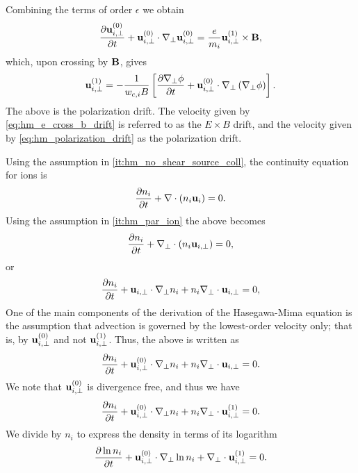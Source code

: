 \documentclass[11pt]{article}
\begin{document}
Combining the terms of order $\epsilon$ we obtain
\begin{equation}
    \frac{\partial \mathbf{u}_{i,\perp}^{(0)}}{\partial t} + \mathbf{u}_{i,\perp}^{(0)} \cdot \nabla_\perp \mathbf{u}_{i,\perp}^{(0)} = \frac{e}{m_i} \mathbf{u}_{i,\perp}^{(1)} \times \mathbf{B},
\end{equation}
which, upon crossing by $\mathbf{B}$, gives
\begin{equation}
\label{eq:hm_polarization_drift}
    \mathbf{u}_{i,\perp}^{(1)} = -\frac{1}{w_{c,i} B} \left [ \frac{\partial \nabla_\perp \phi}{\partial t} + \mathbf{u}_{i,\perp}^{(0)} \cdot \nabla_\perp \left ( \nabla_\perp \phi \right ) \right ].
\end{equation}
The above is the polarization drift. The velocity given by \cref{eq:hm_e_cross_b_drift} is referred to as the $E \times B$ drift, and the velocity given by \cref{eq:hm_polarization_drift} as the polarization drift.

Using the assumption in \cref{it:hm_no_shear_source_coll}, the continuity equation for ions is
\begin{equation}
    \frac{\partial n_i}{\partial t} + \nabla \cdot (n_i \mathbf{u}_i) = 0.
\end{equation}
Using the assumption in \cref{it:hm_par_ion} the above becomes
\begin{equation}
    \frac{\partial n_i}{\partial t} + \nabla_\perp \cdot (n_i \mathbf{u}_{i,\perp}) = 0,
\end{equation}
or
\begin{equation}
    \frac{\partial n_i}{\partial t} +  \mathbf{u}_{i,\perp} \cdot \nabla_\perp n_i + n_i \nabla_\perp \cdot \mathbf{u}_{i,\perp} = 0,
\end{equation}
One of the main components of the derivation of the Hasegawa-Mima equation is the assumption that advection is governed by the lowest-order velocity only; that is, by $\mathbf{u}^{(0)}_{i,\perp}$ and not $\mathbf{u}^{(1)}_{i,\perp}$. Thus, the above is written as
\begin{equation}
    \frac{\partial n_i}{\partial t} +  \mathbf{u}^{(0)}_{i,\perp} \cdot \nabla_\perp n_i + n_i \nabla_\perp \cdot \mathbf{u}_{i,\perp} = 0.
\end{equation}
We note that $\mathbf{u}^{(0)}_{i,\perp}$ is divergence free, and thus we have
\begin{equation}
    \frac{\partial n_i}{\partial t} +  \mathbf{u}^{(0)}_{i,\perp} \cdot \nabla_\perp n_i + n_i \nabla_\perp \cdot \mathbf{u}^{(1)}_{i,\perp} = 0.
\end{equation}
We divide by $n_i$ to express the density in terms of its logarithm 
\begin{equation}
    \label{eq:intermediate_hm_1}
    \frac{\partial \ln n_i}{\partial t} + \mathbf{u}^{(0)}_{i,\perp} \cdot \nabla_\perp \ln n_i + \nabla_\perp \cdot \mathbf{u}^{(1)}_{i,\perp} = 0.
\end{equation}
\end{document}
